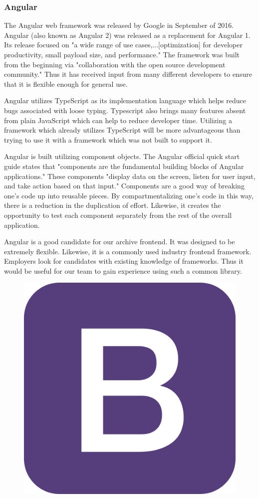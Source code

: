 \documentclass[12pt]{report}
\begin{document}
\subsubsection*{Angular}

The Angular web framework was released by Google in September of 2016.\cite{angularrelease} Angular (also known as Angular 2) was released as a replacement for Angular 1. Its release focused on "a wide range of use cases,...[optimization] for developer productivity, small payload size, and performance."\cite{angularrelease} The framework was built from the beginning via "collaboration with the open source development community."\cite{angularrelease} Thus it has received input from many different developers to ensure that it is flexible enough for general use.

Angular utilizes TypeScript as its implementation language which helps reduce bugs associated with loose typing. Typescript also brings many features absent from plain JavaScript which can help to reduce developer time. Utilizing a framework which already utilizes TypeScript will be more advantageous than trying to use it with a framework which was not built to support it.

Angular is built utilizing component objects. The Angular official quick start guide states that "components are the fundamental building blocks of Angular applications."\cite{angularquickstart} These components "display data on the screen, listen for user input, and take action based on that input."\cite{angularquickstart} Components are a good way of breaking one's code up into reusable pieces. By compartmentalizing one's code in this way, there is a reduction in the duplication of effort. Likewise, it creates the opportunity to test each component separately from the rest of the overall application.

Angular is a good candidate for our archive frontend. It was designed to be extremely flexible. Likewise, it is a commonly used industry frontend framework. Employers look for candidates with existing knowledge of frameworks. Thus it would be useful for our team to gain experience using such a common library.

\begin{figure}[h]
	\centering
	\includegraphics[width=0.25\linewidth]{bootstrap}
\end{figure}
\end{document}
